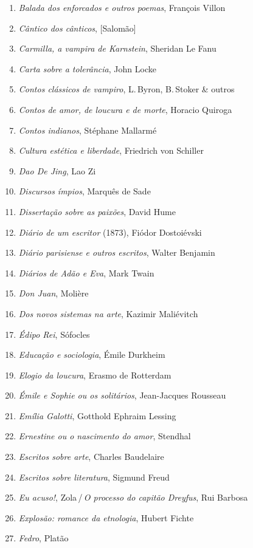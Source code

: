 \begin{enumerate}
\item \textit{Balada dos enforcados e outros poemas}, François Villon
\item \textit{Cântico dos cânticos}, [Salomão]
\item \textit{Carmilla, a vampira de Karnstein}, Sheridan Le Fanu
\item \textit{Carta sobre a tolerância}, John Locke
\item \textit{Contos clássicos de vampiro}, L.\,Byron, B.\,Stoker \& outros
\item \textit{Contos de amor, de loucura e de morte}, Horacio Quiroga
\item \textit{Contos indianos}, Stéphane Mallarmé
\item \textit{Cultura estética e liberdade}, Friedrich von Schiller
\item \textit{Dao De Jing}, Lao Zi
\item \textit{Discursos ímpios}, Marquês de Sade
\item \textit{Dissertação sobre as paixões}, David Hume
\item \textit{Diário de um escritor} (1873), Fiódor Dostoiévski
\item \textit{Diário parisiense e outros escritos}, Walter Benjamin
\item \textit{Diários de Adão e Eva}, Mark Twain
\item \textit{Don Juan}, Molière
\item \textit{Dos novos sistemas na arte}, Kazimir Maliévitch
\item \textit{Édipo Rei}, Sófocles
\item \textit{Educação e sociologia}, Émile Durkheim
\item \textit{Elogio da loucura}, Erasmo de Rotterdam
\item \textit{Émile e Sophie ou os solitários}, Jean-Jacques Rousseau 
\item \textit{Emília Galotti}, Gotthold Ephraim Lessing
\item \textit{Ernestine ou o nascimento do amor}, Stendhal
\item \textit{Escritos sobre arte}, Charles Baudelaire
\item \textit{Escritos sobre literatura}, Sigmund Freud
\item \textit{Eu acuso!}, Zola\,/\,\textit{O processo do capitão Dreyfus}, Rui Barbosa
\item \textit{Explosão: romance da etnologia}, Hubert Fichte
\item \textit{Fedro}, Platão

\end{enumerate}
